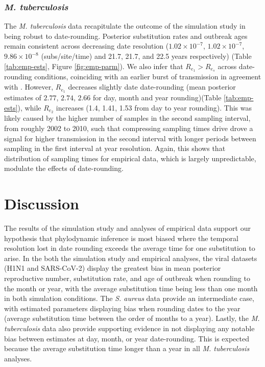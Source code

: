 \documentclass[12pt]{article}
\begin{document}
\begin{spacing}{2}
\subsubsection*{\textit{M. tuberculosis}}
The \textit{M. tuberculosis} data recapitulate the outcome of the simulation study in being robust to date-rounding. Posterior substitution rates and outbreak ages remain consistent across decreasing date resolution ($1.02\times10^{-7}$, $1.02\times10^{-7}$, $9.86\times10^{-8}$ (subs/site/time) and 21.7, 21.7, and 22.5 years respectively) (Table \ref{tab:emp-ests}, Figure \ref{fig:emp-parm}). We also infer that $R_{e_1} > R_{e_s}$ across date-rounding conditions, coinciding with an earlier burst of transmission in agreement with \citet{kuhnert_tuberculosis_2018}. However, $R_{e_1}$ decreases slightly date date-rounding (mean posterior estimates of $2.77$, $2.74$, $2.66$ for day, month and year rounding)(Table \ref{tab:emp-ests}), while $R_{e_2}$ increases (1.4, 1.41, 1.53 from day to year rounding). This was likely caused by the higher number of samples in the second sampling interval, from roughly 2002 to 2010, such that compressing sampling times drive drove a signal for higher transmission in the second interval with longer periods between sampling in the first interval at year resolution. Again, this shows that distribution of sampling times for empirical data, which is largely unpredictable, modulate the effects of date-rounding.

\section*{Discussion}
The results of the simulation study and analyses of empirical data support our hypothesis that phylodynamic inference is most biased where the temporal resolution lost in date rounding exceeds the average time for one substitution to arise. In the both the simulation study and empirical analyses, the viral datasets (H1N1 and SARS-CoV-2) display the greatest bias in mean posterior reproductive number, substitution rate, and age of outbreak when rounding to the month or year, with the average substitution time being less than one month in both simulation conditions. The \textit{S. aureus} data provide an intermediate case, with estimated parameters displaying bias when rounding dates to the year (average substitution time between the order of months to a year). Lastly, the \textit{M. tuberculosis} data also provide supporting evidence in not displaying any notable bias between estimates at day, month, or year date-rounding. This is expected because the average substitution time longer than a year in all \textit{M. tuberculosis} analyses.  


\end{spacing}
\end{document}
